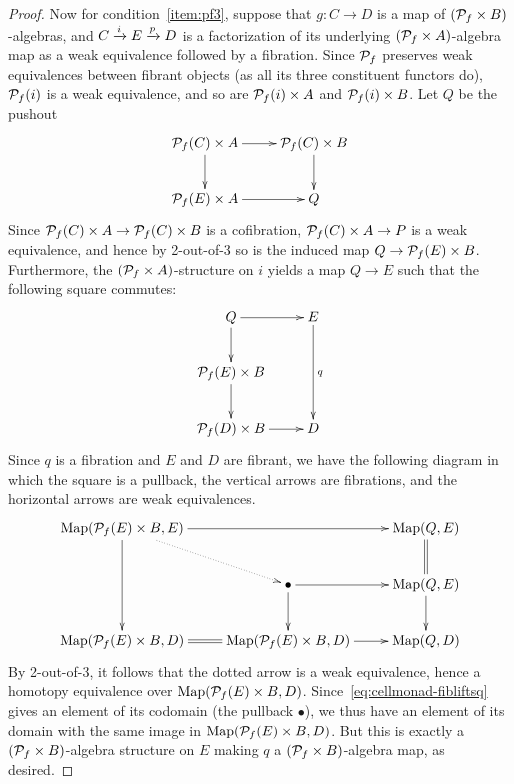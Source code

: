 \documentclass{amsart}
\begin{document}
\begin{proof}
  Now for condition~\ref{item:pf3}, suppose that $g:C\to D$ is a map of $(\mathcal{P}_{f} \times B)$-algebras, and $C\xrightarrow{i} E\xrightarrow{p} D$ is a factorization of its underlying $(\mathcal{P}_{f} \times A)$-algebra map as a weak equivalence followed by a fibration.
  Since $\mathcal{P}_{f}$ preserves weak equivalences between fibrant objects (as all its three constituent functors do), $\mathcal{P}_{f}(i)$ is a weak equivalence, and so are $\mathcal{P}_{f}(i) \times A$ and $\mathcal{P}_{f}(i) \times B$.
  Let $Q$ be the pushout
  \begin{equation}
    \vcenter{\xymatrix{
        \poly f(C) \times A \ar[r]\ar[d] &
        \poly f(C) \times B\ar[d]\\
        \poly f(E) \times A\ar[r] &
        Q
      }}
  \end{equation}
  Since $\mathcal{P}_{f}(C) \times A \to \mathcal{P}_{f}(C)\times B$ is a cofibration, $\mathcal{P}_{f}(C) \times A \to P$ is a weak equivalence, and hence by 2-out-of-3 so is the induced map $Q \to \mathcal{P}_{f}(E) \times B$.
  Furthermore, the $({\mathcal{P}_{f} \times A})$-structure on $i$ yields a map $Q\to E$ such that the following square commutes:
  \begin{equation}
    \vcenter{\xymatrix{
        Q\ar[r]\ar[d] &
        E\ar[dd]^q\\
        \poly f(E) \times B\ar[d] &
        \\
        \poly f(D) \times B \ar[r] &
        D
      }}\label{eq:cellmonad-fibliftsq}
  \end{equation}
  Since $q$ is a fibration and $E$ and $D$ are fibrant, we have the following diagram in which the square is a pullback, the vertical arrows are fibrations, and the horizontal arrows are weak equivalences.
  \begin{equation}
    \vcenter{\xymatrix{
        \map(\poly f(E) \times B,E) \ar[rr] \ar[dd] \ar@{.>}[dr] && \map(Q,E) \ar@{=}[d] \\
        &\bullet\ar[r]\ar[d] &
        \map(Q, E) \ar[d]\\
        \map(\poly f(E) \times B, D) \ar@{=}[r] &
        \map(\poly f(E) \times B, D) \ar[r] &
        \map(Q, D)
      }}
  \end{equation}
  By 2-out-of-3, it follows that the dotted arrow is a weak equivalence, hence a homotopy equivalence over $\mathrm{Map}(\mathcal{P}_{f}(E) \times B, D)$.
  Since~\eqref{eq:cellmonad-fibliftsq} gives an element of its codomain (the pullback $\bullet$), we thus have an element of its domain with the same image in $\mathrm{Map}(\mathcal{P}_{f}(E) \times B, D)$.
  But this is exactly a $(\mathcal{P}_{f} \times B)$-algebra structure on $E$ making $q$ a $(\mathcal{P}_{f} \times B)$-algebra map, as desired.
\end{proof}
\end{document}
